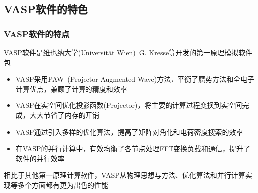 \small
%

\subsection{\rm{VASP}软件的特色}
\frame
{
	\frametitle{\textrm{VASP}软件的特点}
	\textrm{VASP}软件是维也纳大学\textrm{(Universit\"at Wien)}~\textrm{G. Kresse}等开发的第一原理模拟软件包
	\begin{itemize}
		\item \textrm{VASP}采用\textrm{PAW~(Projector Augmented-Wave)}方法，平衡了赝势方法和全电子计算优点，兼顾了计算的精度和效率
		\item \textrm{VASP}在实空间优化投影函数\textrm{(Projector)}，将主要的计算过程变换到实空间完成，大大节省了内存的开销%
		\item \textrm{VASP}通过引入多样的优化算法，提高了矩阵对角化和电荷密度搜索的效率
		\item 在\textrm{VASP}的并行计算中，有效均衡了各节点处理\textrm{FFT}变换负载和通信，提升了软件的并行效率
	\end{itemize}
	相比于其他第一原理计算软件，\textrm{VASP}从物理思想与方法、优化算法和并行计算实现等多个方面都有更为出色的性能
}

